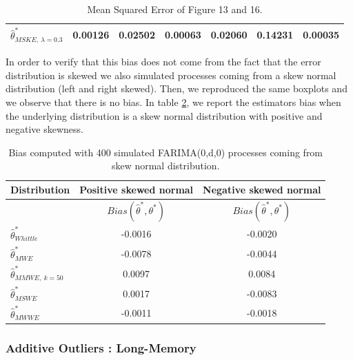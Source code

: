 \documentclass[
  11pt,
]{article}
\begin{document}
\begin{table}[h]
\begin{tabular}{|l|c|c|c|c|c|c|}
$\hat \theta^*_{MSKE, \ \lambda = 0.3}$ & 0.00126                        & 0.02502                         & 0.00063                        & 0.02060                                             & 0.14231                                              & 0.00035                                             \\ \hline
\end{tabular}
\caption{Mean Squared Error of Figure 13 and 16.}
\label{tab:FARIMA_heavy_MSE}
\end{table}

In order to verify that this bias does not come from the fact that the
error distribution is skewed we also simulated processes coming from a
skew normal distribution (left and right skewed). Then, we reproduced
the same boxplots and we observe that there is no bias. In table
\ref{tab:skew_bias}, we report the estimators bias when the underlying
distribution is a skew normal distribution with positive and negative
skewness.

\begin{table}[h]
\centering
\begin{tabular}{|l|c|c|}
\hline
\textbf{Distribution} & \textbf{Positive skewed normal}  & \textbf{Negative skewed normal}     \\ \hline
          & $Bias(\hat \theta^*, \theta^*)$   & $Bias(\hat \theta^*, \theta^*)$  \\ \hline
$\hat \theta^*_{Whittle}$                & -0.0016               & -0.0020             \\ \hline
$\hat \theta^*_{MWE}$                    & -0.0078               & -0.0044              \\ \hline
$\hat \theta^*_{MMWE, \ k = 50}$            & 0.0097              & 0.0084             \\ \hline
$\hat \theta^*_{MSWE}$                    & 0.0017               & -0.0083              \\ \hline
$\hat \theta^*_{MWWE}$                    & -0.0011               & -0.0018              \\ \hline
\end{tabular}
\caption{Bias computed with 400 simulated FARIMA(0,d,0) processes coming from skew normal distribution.}
\label{tab:skew_bias}
\end{table}

\pagebreak

\hypertarget{additive-outliers-long-memory}{%
\subsubsection{Additive Outliers :
Long-Memory}\label{additive-outliers-long-memory}}
\end{document}
